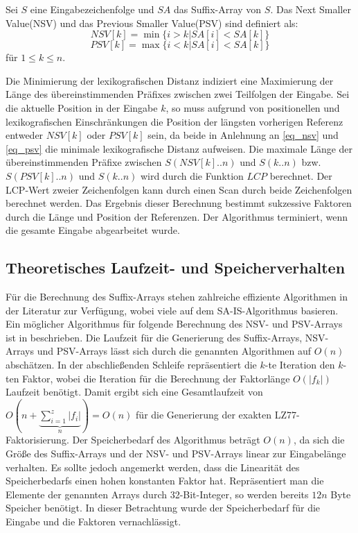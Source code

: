 Sei $S$ eine Eingabezeichenfolge und $SA$ das Suffix-Array von $S$. Das Next Smaller Value(NSV) und das Previous Smaller Value(PSV) sind definiert als:
\begin{equation} \label{eq_nsv}
    NSV[k] = \min\{i > k | SA[i] < SA[k]\}
\end{equation}
\begin{equation} \label{eq_psv}
    PSV[k] = \max\{i < k | SA[i] < SA[k]\}
\end{equation}
für $1\leq k \leq n$.

Die Minimierung der lexikografischen Distanz indiziert eine Maximierung der Länge des übereinstimmenden Präfixes zwischen zwei Teilfolgen der Eingabe.
Sei die aktuelle Position in der Eingabe $k$, so muss aufgrund von positionellen und lexikografischen Einschränkungen die 
Position der längsten vorherigen Referenz entweder $NSV[k]$ oder $PSV[k]$ sein, da beide in Anlehnung an \ref{eq_nsv} und \ref{eq_psv} die
minimale lexikografische Distanz aufweisen. Die maximale Länge der übereinstimmenden Präfixe zwischen $S(NSV[k]..n)$ und $S(k..n)$ bzw. $S(PSV[k]..n)$ 
und $S(k..n)$ wird durch die Funktion $LCP$ berechnet. Der LCP-Wert zweier Zeichenfolgen kann durch einen Scan durch beide
Zeichenfolgen berechnet werden. Das Ergebnis dieser Berechnung bestimmt sukzessive Faktoren durch die Länge und Position der Referenzen. Der Algorithmus 
terminiert, wenn die gesamte Eingabe abgearbeitet wurde.

\subsection{Theoretisches Laufzeit- und Speicherverhalten}
Für die Berechnung des Suffix-Arrays stehen zahlreiche effiziente Algorithmen in der Literatur zur Verfügung, wobei viele auf dem SA-IS-Algorithmus 
\cite{sais} basieren. Ein möglicher Algorithmus für folgende Berechnung des NSV- und PSV-Arrays ist in \cite{nsvpsv} beschrieben. Die Laufzeit für
die Generierung des Suffix-Arrays, NSV-Arrays und PSV-Arrays lässt sich durch die genannten Algorithmen auf $O(n)$ abschätzen. In der abschließenden 
Schleife repräsentiert die $k$-te Iteration den $k$-ten Faktor, wobei die Iteration für die Berechnung der Faktorlänge $O(|f_k|)$ Laufzeit benötigt. 
Damit ergibt sich eine Gesamtlaufzeit von $O(n +\underbrace{\sum_{i=1}^{z} |f_i|}_{n}) = O(n)$ für die Generierung der exakten LZ77-Faktorisierung.
Der Speicherbedarf des Algorithmus beträgt $O(n)$, da sich die Größe des Suffix-Arrays und der NSV- und PSV-Arrays linear zur Eingabelänge verhalten. Es sollte jedoch
angemerkt werden, dass die Linearität des Speicherbedarfs einen hohen konstanten Faktor hat. Repräsentiert man die Elemente der genannten Arrays durch 32-Bit-Integer,
so werden bereits $12n$ Byte Speicher benötigt. In dieser Betrachtung wurde der Speicherbedarf für die Eingabe und die Faktoren vernachlässigt.


